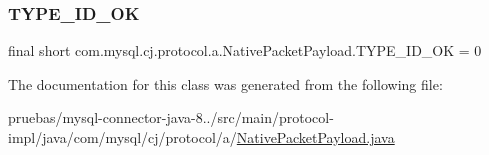 \subsubsection{\texorpdfstring{T\+Y\+P\+E\+\_\+\+I\+D\+\_\+\+OK}{TYPE\_ID\_OK}}
{\footnotesize\ttfamily final short com.\+mysql.\+cj.\+protocol.\+a.\+Native\+Packet\+Payload.\+T\+Y\+P\+E\+\_\+\+I\+D\+\_\+\+OK = 0\hspace{0.3cm}{\ttfamily [static]}}



The documentation for this class was generated from the following file\+:\begin{DoxyCompactItemize}
\item 
pruebas/mysql-\/connector-\/java-\/8../src/main/protocol-\/impl/java/com/mysql/cj/protocol/a/\mbox{\hyperlink{_native_packet_payload_8java}{Native\+Packet\+Payload.\+java}}\end{DoxyCompactItemize}
